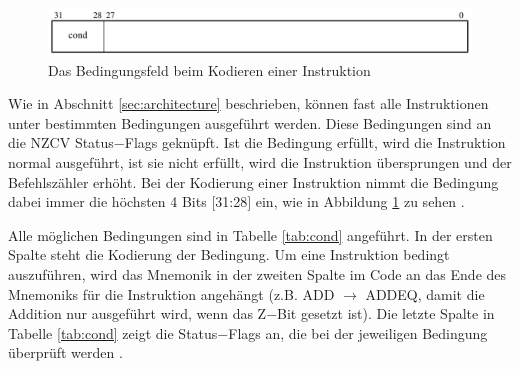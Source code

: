\documentclass[a4paper, 11pt, onecolumn]{article}
\begin{document}
\begin{figure}[!htb]
\centering
\includegraphics[width=1\textwidth]{data/cond}
\caption{Das Bedingungsfeld beim Kodieren einer Instruktion \cite{arm:2005}}
\label{fig:cond}
\end{figure}

Wie in Abschnitt \ref{sec:architecture} beschrieben, können fast alle Instruktionen unter bestimmten Bedingungen ausgeführt werden. Diese Bedingungen sind an die NZCV Status$-$Flags geknüpft. Ist die Bedingung erfüllt, wird die Instruktion normal ausgeführt, ist sie nicht erfüllt, wird die Instruktion übersprungen und der Befehlszähler erhöht. Bei der Kodierung einer Instruktion nimmt die Bedingung dabei immer die höchsten 4 Bits $[$31:28$]$ ein, wie in Abbildung \ref{fig:cond} zu sehen \cite{arm:2005}.



Alle möglichen Bedingungen sind in Tabelle \ref{tab:cond} angeführt. In der ersten Spalte steht die Kodierung der Bedingung. Um eine Instruktion bedingt auszuführen, wird das Mnemonik in der zweiten Spalte im Code an das Ende des Mnemoniks für die Instruktion angehängt (z.B. ADD $\rightarrow$ ADDEQ, damit die Addition nur ausgeführt wird, wenn das Z$-$Bit gesetzt ist). Die letzte Spalte in Tabelle \ref{tab:cond} zeigt die Status$-$Flags an, die bei der jeweiligen Bedingung überprüft werden \cite{arm:2005}. 
\end{document}
